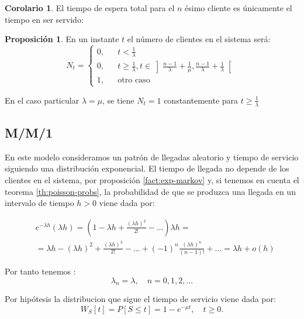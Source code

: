 \documentclass[a4paper,10pt]{scrartcl}
\theoremstyle{definition}
\newtheorem*{fact*}{Proposición}
\newtheorem*{corollary*}{Corolario}
\numberwithin{equation}{section}
\begin{document}
	\begin{corollary*}
		El tiempo de espera total para el $n$ ésimo cliente es únicamente el tiempo en ser servido:
		
		
	\end{corollary*}
	
	\begin{fact*}
		En un instante $t$ el número de clientes en el sistema será: 
		\[N_t = \left\{\begin{array}{lcc}
		0, && t < \frac{1}{\lambda}\\
		0, && t \ge \frac{1}{\lambda}, t \in \left]\frac{n-1}{\lambda} + \frac{1}{\mu}, \frac{n-1}{\lambda} + \frac{1}{\lambda}\right[\\
		1, && \text{otro caso}
		\end{array}\right.\]
	\end{fact*}
	
	En el caso particular $\lambda = \mu$, se tiene $N_t = 1$ constantemente para $t\ge \frac{1}{\lambda}$
	
	\subsection{M/M/1}
	
	En este modelo consideramos un patrón de llegadas aleatorio y tiempo de servicio siguiendo una distribución 
	exponencial. El tiempo de llegada no depende de los clientes en el sistema, por proposición \ref{fact:exp-markov}
	y, si tenemos en cuenta el teorema \ref{th:poisson-probs}, la probabilidad de que se produzca una llegada 
	en un intervalo de tiempo $h>0$ viene dada por:
	
	\begin{align*}
	& e^{-\lambda h}(\lambda h)= \left(1-\lambda h+\frac{(\lambda h)^2}{2!}- \dots\right) \lambda h = \\
	& =\lambda h-(\lambda h)^2+\frac{(\lambda h)^3}{2!}-\dots+(-1)^n\frac{(\lambda h)^n}{(n-1)!} + \ldots = \lambda h+o(h)
	\end{align*}
	
	Por tanto tenemos :
	\begin{equation*}
	\lambda_n=\lambda, \quad n=0,1,2,\dots
	\end{equation*}
	
	Por hipótesis la distribucion que sigue el tiempo de servicio viene dada por:
	\begin{equation*}
	W_S[t] = P[S\leq t] = 1-e^{-\mu t}, \quad t\ge 0.
	\end{equation*}
	
\end{document}
